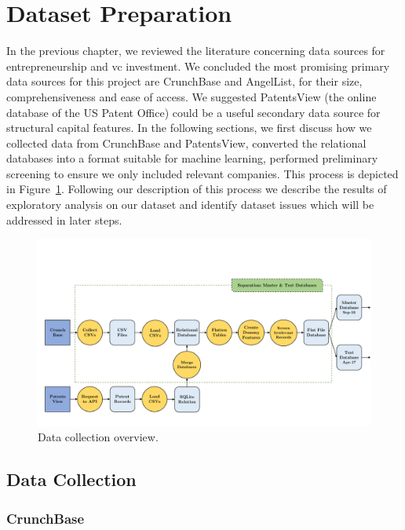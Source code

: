 \documentclass[../thesis/thesis.tex]{subfiles}
\begin{document}
\section{Dataset Preparation}

In the previous chapter, we reviewed the literature concerning data sources for entrepreneurship and \gls{vc} investment. We concluded the most promising primary data sources for this project are CrunchBase and AngelList, for their size, comprehensiveness and ease of access. We suggested PatentsView (the online database of the US Patent Office) could be a useful secondary data source for structural capital features. In the following sections, we first discuss how we collected data from CrunchBase and PatentsView, converted the relational databases into a format suitable for machine learning, performed preliminary screening to ensure we only included relevant companies. This process is depicted in Figure~\ref{fig:design:data_collection}. Following our description of this process we describe the results of exploratory analysis on our dataset and identify dataset issues which will be addressed in later steps.

\begin{figure}[!htb]
    \centering
    \includegraphics[width=\textwidth]{../figures/design/data_collection}
    \caption[Data collection flowchart]{Data collection overview.}
    \label{fig:design:data_collection}
\end{figure}


\subsection{Data Collection}

\subsubsection{CrunchBase}
\end{document}
